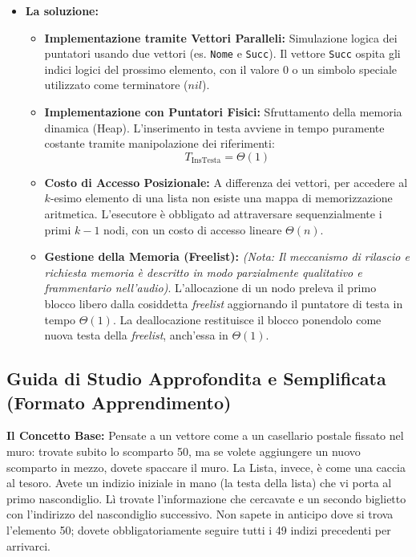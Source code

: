 \documentclass[a4paper, 11pt]{report}
\begin{document}
\begin{itemize}
\item \textbf{La soluzione:}
\begin{itemize}
    \item \textbf{Implementazione tramite Vettori Paralleli:} Simulazione logica dei puntatori usando due vettori (es. \texttt{Nome} e \texttt{Succ}). Il vettore \texttt{Succ} ospita gli indici logici del prossimo elemento, con il valore $0$ o un simbolo speciale utilizzato come terminatore ($nil$).
    \item \textbf{Implementazione con Puntatori Fisici:} Sfruttamento della memoria dinamica (Heap). L'inserimento in testa avviene in tempo puramente costante tramite manipolazione dei riferimenti:
    \[ T_{\text{InsTesta}} = \Theta(1) \]
    \item \textbf{Costo di Accesso Posizionale:} A differenza dei vettori, per accedere al $k$-esimo elemento di una lista non esiste una mappa di memorizzazione aritmetica. L'esecutore è obbligato ad attraversare sequenzialmente i primi $k-1$ nodi, con un costo di accesso lineare $\Theta(n)$.
    \item \textbf{Gestione della Memoria (Freelist):} \textit{(Nota: Il meccanismo di rilascio e richiesta memoria è descritto in modo parzialmente qualitativo e frammentario nell'audio)}. L'allocazione di un nodo preleva il primo blocco libero dalla cosiddetta \textit{freelist} aggiornando il puntatore di testa in tempo $\Theta(1)$. La deallocazione restituisce il blocco ponendolo come nuova testa della \textit{freelist}, anch'essa in $\Theta(1)$.
\end{itemize}
\end{itemize}

\vspace{0.5cm}
\subsection*{Guida di Studio Approfondita e Semplificata (Formato Apprendimento)}
\textbf{Il Concetto Base:}
Pensate a un vettore come a un casellario postale fissato nel muro: trovate subito lo scomparto 50, ma se volete aggiungere un nuovo scomparto in mezzo, dovete spaccare il muro.
La Lista, invece, è come una caccia al tesoro. Avete un indizio iniziale in mano (la testa della lista) che vi porta al primo nascondiglio. Lì trovate l'informazione che cercavate e un secondo biglietto con l'indirizzo del nascondiglio successivo. Non sapete in anticipo dove si trova l'elemento 50; dovete obbligatoriamente seguire tutti i 49 indizi precedenti per arrivarci.
\end{document}
